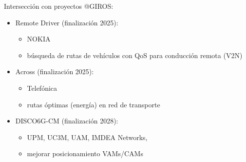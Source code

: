 \documentclass[xcolor=table,xcolor=x11names]{beamer}
\begin{document}
\begin{frame}{\subsecname}
    Intersección con proyectos @GIROS:
    \begin{itemize}
        \item Remote Driver (finalización 2025):
            \begin{itemize}
                \item NOKIA
                \item búsqueda de rutas de
                    vehículos con QoS para
                    conducción remota (V2N)
            \end{itemize}
        \item Across (finalización 2025):
            \begin{itemize}
                \item Telefónica
                \item rutas óptimas (energía) en red
                    de transporte
            \end{itemize}
        \item DISCO6G-CM (finalización 2028):
            \begin{itemize}
                \item UPM, UC3M, UAM, IMDEA Networks, 
                \item mejorar posicionamiento VAMs/CAMs
            \end{itemize}
    \end{itemize}
\end{frame}




\begin{frame}
\titlepage
\end{frame}
\end{document}
